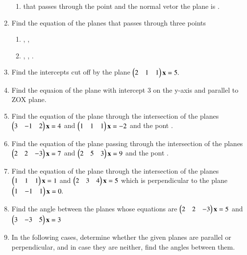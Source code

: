 \begin{enumerate}[label=\arabic*.,ref=\thesubsection.\theenumi]
\begin{enumerate}
\item that passes through the point  and the normal vetor the plane is .
\end{enumerate}
\item Find the equation of the planes that passes through three points
\begin{enumerate}
\item {}, , 
\item {}, , .
\end{enumerate}
\item Find the intercepts cut off by the plane 
$
\begin{pmatrix}2 & 1 & 1\end{pmatrix}\mathbf{x}=5.
$
\item Find the equaion of the plane with intercept 3 on the y-axis and parallel to ZOX plane.
\item Find the equation of the plane through the intersection of the planes 
$
\begin{pmatrix}3 & -1 & 2\end{pmatrix}\mathbf{x}=4
$
 and 
$
\begin{pmatrix}1 & 1 & 1\end{pmatrix}\mathbf{x}=-2
$
and the pont .
%
\item Find the equation of the plane passing through the intersection of the planes 
$
\begin{pmatrix}2 & 2 & -3\end{pmatrix}\mathbf{x}=7
$
 and 
$
\begin{pmatrix}2 & 5 & 3\end{pmatrix}\mathbf{x}=9
$
and the pont .
%
\item  Find the equation of the plane through the intersection of the planes
$
\begin{pmatrix}1 & 1 & 1\end{pmatrix}\mathbf{x}=1
$
 and 
$
\begin{pmatrix}2 & 3 & 4\end{pmatrix}\mathbf{x}=5
$
which is perpendicular to the plane 
$
\begin{pmatrix}1 & -1 & 1\end{pmatrix}\mathbf{x}=0.
$
%
\item Find the angle between the planes whose equations are
$
\begin{pmatrix}2 & 2 & -3\end{pmatrix}\mathbf{x}=5
$
 and 
$
\begin{pmatrix}3 & -3 & 5\end{pmatrix}\mathbf{x}=3
$
%
\item In the following cases, determine whether the given planes are parallel or perpendicular, and in case they are neither, find the angles between them.

\end{enumerate}
